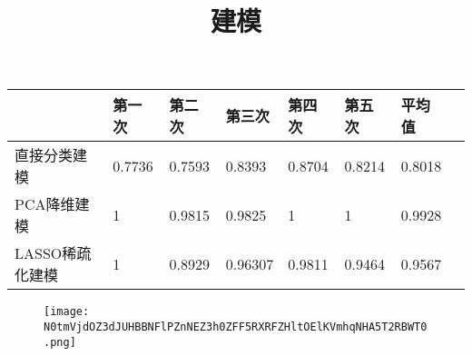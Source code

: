 \documentclass[tp12]{ctexart}
\title{建模}
\author{}
\date{}
\begin{document}
\begin{center}

    \begin{tabular}{l l l l l l l l}
    \hline
    ~&第一次&第二次&第三次&第四次&第五次&平均值\\
    \hline
    直接分类建模&0.7736&0.7593&0.8393&0.8704&0.8214&0.8018\\
    PCA降维建模&1&0.9815&0.9825&1&1&0.9928\\
    LASSO稀疏化建模&1&0.8929&0.96307&0.9811&0.9464&0.9567\\
    \hline
    \end{tabular}

\end{center}

    \begin{figure}[H]
    \centering
    \texttt{[image: N0tmVjdOZ3dJUHBBNFlPZnNEZ3h0ZFF5RXRFZHltOElKVmhqNHA5T2RBWT0.png]}
    \label{}
    \end{figure}

\end{document}
